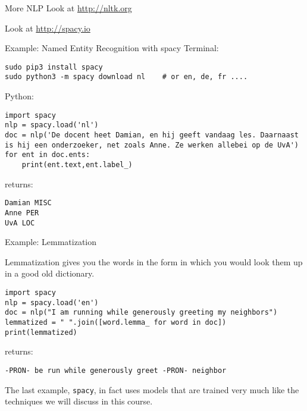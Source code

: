 \documentclass[compress]{beamer}
\begin{document}
\begin{frame}{More NLP}
\Huge{Look at \url{http://nltk.org}}

\Huge{Look at \url{http://spacy.io}}

\end{frame}



\begin{frame}[fragile]{Example: Named Entity Recognition with spacy}
Terminal:

\begin{lstlisting}
sudo pip3 install spacy
sudo python3 -m spacy download nl    # or en, de, fr ....
\end{lstlisting}

Python:

\begin{lstlisting}
import spacy
nlp = spacy.load('nl')
doc = nlp('De docent heet Damian, en hij geeft vandaag les. Daarnaast is hij een onderzoeker, net zoals Anne. Ze werken allebei op de UvA')
for ent in doc.ents:
    print(ent.text,ent.label_)
\end{lstlisting}

returns:

\begin{lstlisting}
Damian MISC
Anne PER
UvA LOC
\end{lstlisting}  

\end{frame}



\begin{frame}[fragile]{Example: Lemmatization}

Lemmatization gives you the words in the form in which you would look them up in a good old dictionary.

\begin{lstlisting}
import spacy
nlp = spacy.load('en')
doc = nlp("I am running while generously greeting my neighbors")
lemmatized = " ".join([word.lemma_ for word in doc])
print(lemmatized)
\end{lstlisting}

returns:

\begin{lstlisting}
-PRON- be run while generously greet -PRON- neighbor
\end{lstlisting}  

\end{frame}


\begin{frame}[standout]
	The last example, \texttt{spacy}, in fact uses models that are trained very much like the techniques we will discuss in this course.
\end{frame}
\end{document}
